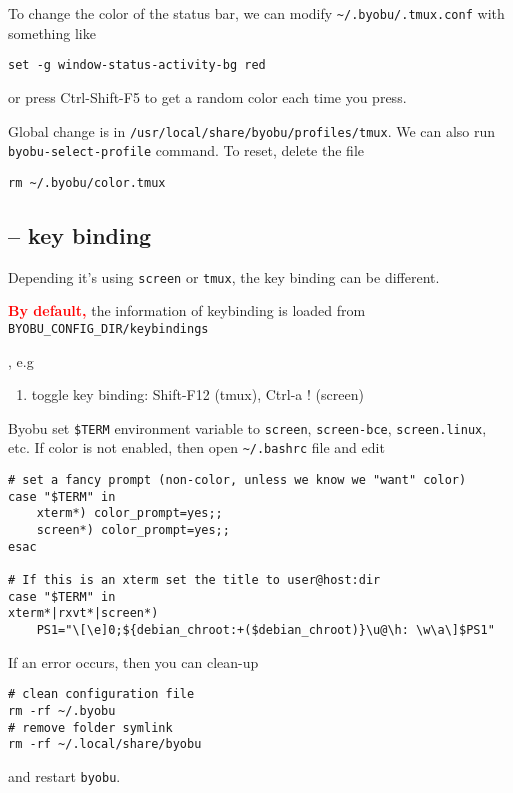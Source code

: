 To change the color of the status bar, we can modify \verb!~/.byobu/.tmux.conf!
with something like
\begin{verbatim}
set -g window-status-activity-bg red
\end{verbatim}
or press Ctrl-Shift-F5 to get a random color each time you press.


\begin{framed}
Global change is in \verb!/usr/local/share/byobu/profiles/tmux!. We can also run
\verb!byobu-select-profile! command. To reset, delete the file 
\begin{verbatim}
rm ~/.byobu/color.tmux
\end{verbatim}
\end{framed}

\subsection{-- key binding}
\label{sec:byobu-key-binding}


Depending it's using \verb!screen! or \verb!tmux!, the key binding can be
different. 

\textcolor{red}{\bf By default, } the information of keybinding is loaded from 
\verb!BYOBU_CONFIG_DIR/keybindings!


, e.g
\begin{enumerate}
  \item toggle key binding: Shift-F12 (tmux), Ctrl-a ! (screen)
\end{enumerate}

Byobu set \verb!$TERM! environment variable to  \verb!screen!,
\verb!screen-bce!, \verb!screen.linux!, etc. If color is not enabled, then open
\verb!~/.bashrc! file and edit
\begin{verbatim}
# set a fancy prompt (non-color, unless we know we "want" color)
case "$TERM" in
    xterm*) color_prompt=yes;;
    screen*) color_prompt=yes;;
esac    
    
# If this is an xterm set the title to user@host:dir
case "$TERM" in
xterm*|rxvt*|screen*)
    PS1="\[\e]0;${debian_chroot:+($debian_chroot)}\u@\h: \w\a\]$PS1"
\end{verbatim}



If an error occurs, then you can clean-up
\begin{verbatim}
# clean configuration file
rm -rf ~/.byobu
# remove folder symlink
rm -rf ~/.local/share/byobu
\end{verbatim}
and restart \verb!byobu!.

